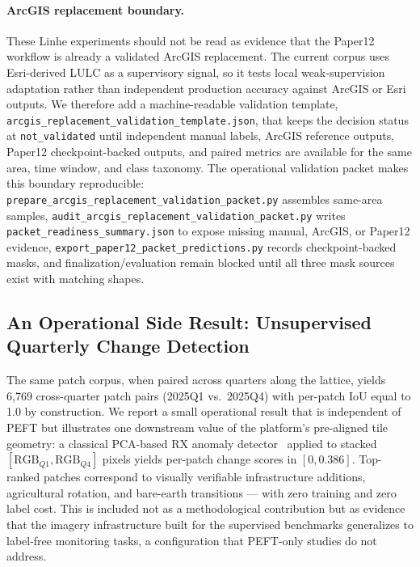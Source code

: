 \documentclass[11pt]{article}
\begin{document}
\paragraph{ArcGIS replacement boundary.}
These Linhe experiments should not be read as evidence that the Paper12 workflow is already a validated ArcGIS replacement. The current corpus uses Esri-derived LULC as a supervisory signal, so it tests local weak-supervision adaptation rather than independent production accuracy against ArcGIS or Esri outputs. We therefore add a machine-readable validation template, \texttt{arcgis\_replacement\_validation\_template.json}, that keeps the decision status at \texttt{not\_validated} until independent manual labels, ArcGIS reference outputs, Paper12 checkpoint-backed outputs, and paired metrics are available for the same area, time window, and class taxonomy. The operational validation packet makes this boundary reproducible: \texttt{prepare\_arcgis\_replacement\_validation\_packet.py} assembles same-area samples, \texttt{audit\_arcgis\_replacement\_validation\_packet.py} writes \texttt{packet\_readiness\_summary.json} to expose missing manual, ArcGIS, or Paper12 evidence, \texttt{export\_paper12\_packet\_predictions.py} records checkpoint-backed masks, and finalization/evaluation remain blocked until all three mask sources exist with matching shapes.

\subsection{An Operational Side Result: Unsupervised Quarterly Change Detection}

The same patch corpus, when paired across quarters along the lattice, yields 6{,}769 cross-quarter patch pairs (2025Q1 vs.\ 2025Q4) with per-patch IoU equal to 1.0 by construction. We report a small operational result that is independent of PEFT but illustrates one downstream value of the platform's pre-aligned tile geometry: a classical PCA-based RX anomaly detector~\cite{reed1990rx} applied to stacked $[\text{RGB}_{Q1}, \text{RGB}_{Q4}]$ pixels yields per-patch change scores in $[0, 0.386]$. Top-ranked patches correspond to visually verifiable infrastructure additions, agricultural rotation, and bare-earth transitions --- with zero training and zero label cost. This is included not as a methodological contribution but as evidence that the imagery infrastructure built for the supervised benchmarks generalizes to label-free monitoring tasks, a configuration that PEFT-only studies do not address.
\end{document}
